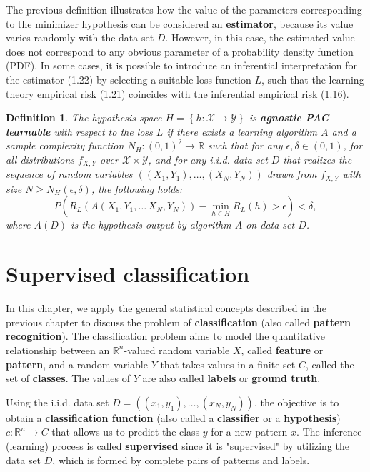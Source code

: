 \documentclass{report}
\newtheorem{definition}{Definition}[chapter]
\begin{document}
The previous definition illustrates how the value of the parameters corresponding to the minimizer hypothesis can be considered an \textbf{estimator}, because its value varies randomly with the data set $D$. However, in this case, the estimated value does not correspond to any obvious parameter of a probability density function (PDF). In some cases, it is possible to introduce an inferential interpretation for the estimator (1.22) by selecting a suitable loss function $L$, such that the learning theory empirical risk (1.21) coincides with the inferential empirical risk (1.16).

\begin{definition}
The hypothesis space $H = \left\{h : \mathcal{X} \to \mathcal{Y}\right\}$ is \textbf{agnostic PAC learnable} with respect to the loss $L$ if there exists a learning algorithm $A$ and a sample complexity function $N_H : (0,1) ^2 \to \mathbb{R}$ such that for any $\epsilon,\delta \in (0,1)$, for all distributions $f_{X,Y}$ over $\mathcal{X} \times \mathcal{Y}$, and for any i.i.d. data set $D$ that realizes the sequence of random variables $((X_1, Y_1),\dots,(X_N, Y_N))$ drawn from $f_{X,Y}$ with size $N\geq N_H(\epsilon,\delta)$, the following holds:
\begin{equation}
P\left(R_L(A(X_1, Y_1,\dots\,X_N, Y_N)) - \min_{h\in H}R_L(h) > \epsilon\right) < \delta,
\end{equation}
where $A(D)$ is the hypothesis output by algorithm $A$ on data set $D$.
\end{definition}

\chapter{Supervised classification}
In this chapter, we apply the general statistical concepts described in the previous chapter to discuss the problem of \textbf{classification} (also called \textbf{pattern recognition}). The classification problem aims to model the quantitative relationship between an $\mathbb{R}^n$-valued random variable $X$, called \textbf{feature} or \textbf{pattern}, and a random variable $Y$ that takes values in a finite set $C$, called the set of \textbf{classes}. The values of $Y$ are also called \textbf{labels} or \textbf{ground truth}.

Using the i.i.d. data set $D = ((x_1,y_1),\dots,(x_N,y_N))$, the objective is to obtain a \textbf{classification function} (also called a \textbf{classifier} or a \textbf{hypothesis}) $c : \mathbb{R}^n \to C$ that allows us to predict the class $y$ for a new pattern $x$. The inference (learning) process is called \textbf{supervised} since it is "supervised" by utilizing the data set $D$, which is formed by complete pairs of patterns and labels.
\end{document}
